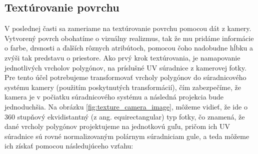 \subsection{Textúrovanie povrchu}
\noindent V poslednej časti sa zameriame na textúrovanie povrchu pomocou dát z kamery. Vytvorený povrch obohatíme o vizuálny realizmus, tak že mu pridáme informácie o farbe, drsnosti a ďalších rôznych atribútoch, pomocou čoho nadobudne hĺbku a zvýši tak predstavu o priestore.
\newline\indent Ako prvý krok textúrovania, je namapovanie jednotlivých vrcholov polygónov, na príslušné UV súradnice z kamerovej fotky. Pre tento účel potrebujeme transformovať vrcholy polygónov do súradnicového systému kamery (použitím poskytnutých transformácií), čím zabezpečíme, že kamera je v počiatku súradnicového systému a následná projekcia bude jednoduchšia. Na obrázku \ref{fig:texture_camera_image}, môžeme vidieť, že ide o 360 stupňový ekvidistantný (z ang. equirectangular) typ fotky, čo znamená, že dané vrcholy polygónov projektujeme na jednotkovú guľu, pričom ich UV súradnice sú rovné normalizovaným polárnym súradniciam gule, a teda môžeme ich získať pomocou následujúceho vzťahu:

